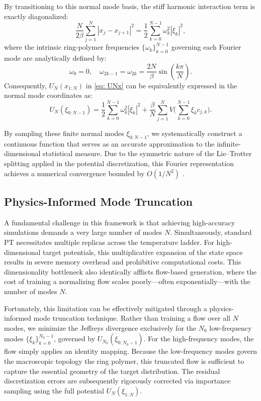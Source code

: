 \documentclass[%
 reprint,
 amsmath,amssymb,
 aps,
 pre,
]{revtex4-2}
\begin{document}
By transitioning to this normal mode basis, the stiff harmonic interaction term is exactly diagonalized:
\begin{equation}
    \frac{N}{2\beta} \sum_{j=1}^N |x_j - x_{j+1}|^2 = \frac{1}{2} \sum_{k=0}^{N-1} \omega_k^2 |\xi_k|^2,
\end{equation}
where the intrinsic ring-polymer frequencies $\{\omega_k\}_{k=0}^{N-1}$ governing each Fourier mode are analytically defined by:
\begin{equation*}
    \omega_0 = 0, \quad \omega_{2k-1} = \omega_{2k} = \frac{2N}{\beta} \sin\left(\frac{k\pi}{N}\right).
\end{equation*}
Consequently, $U_N(x_{1:N})$ in \eqref{eq: UNx} can be equivalently expressed in the normal mode coordinates as:
\begin{equation*}
    U_N(\xi_{0:N-1}) = \frac{1}{2} \sum_{k=0}^{N-1} \omega_k^2 |\xi_k|^2 + \frac{\beta}{N} \sum_{j=1}^N V\bigg( \sum_{k=0}^{N-1} \xi_k c_{j,k} \bigg).
\end{equation*}

By sampling these finite normal modes $\xi_{0:N-1}$, we systematically construct a continuous function that serves as an accurate approximation to the infinite-dimensional statistical measure. Due to the symmetric nature of the Lie--Trotter splitting applied in the potential discretization, this Fourier representation achieves a numerical convergence bounded by $O(1/N^2)$ \cite{ye2023optimal}.

\subsection{Physics-Informed Mode Truncation}

A fundamental challenge in this framework is that achieving high-accuracy simulations demands a very large number of modes $N$. Simultaneously, standard PT necessitates multiple replicas across the temperature ladder. For high-dimensional target potentials, this multiplicative expansion of the state space results in severe memory overhead and prohibitive computational costs. This dimensionality bottleneck also identically afflicts flow-based generation, where the cost of training a normalizing flow scales poorly---often exponentially---with the number of modes $N$.

Fortunately, this limitation can be effectively mitigated through a physics-informed mode truncation technique. Rather than training a flow over all $N$ modes, we minimize the Jeffreys divergence exclusively for the $N_0$ low-frequency modes $\{\xi_k\}_{k=0}^{N_0-1}$, governed by $U_{N_0}(\xi_{0:N_0-1})$. For the high-frequency modes, the flow simply applies an identity mapping. Because the low-frequency modes govern the macroscopic topology the ring polymer, this truncated flow is sufficient to capture the essential geometry of the target distribution. The residual discretization errors are subsequently rigorously corrected via importance sampling using the full potential $U_N(\xi_{1:N})$.
\end{document}
